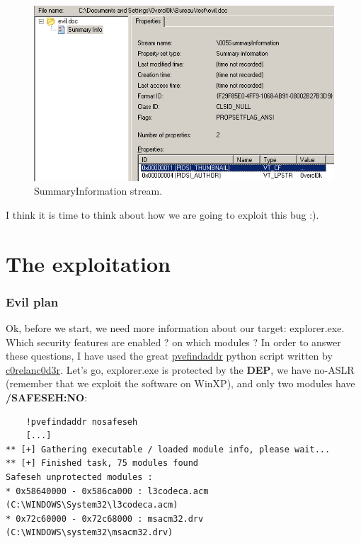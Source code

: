 \documentclass[12pt, titlepage]{article}
\begin{document}
\begin{figure}[H]
    \includegraphics{pics/summary.png}
    \caption{SummaryInformation stream.}
    \label{SummaryInformation stream.}
\end{figure}

I think it is time to think about how we are going to exploit this bug :).
\clearpage

\part{The exploitation}
\section{Evil plan}
Ok, before we start, we need more information about our target: explorer.exe. Which security features are enabled ? on which modules ?
In order to answer these questions, I have used the great \href{http://redmine.corelan.be:8800/projects/pvefindaddr}{pvefindaddr} python script written by \href{http://www.corelan.be/}{c0relanc0d3r}. Let's go, explorer.exe is protected by the \textbf{DEP}, we have no-ASLR (remember that we exploit the software on WinXP), and only two modules have \textbf{/SAFESEH:NO}:

\lstset{caption=Find nosafeseh modules with pvefindaddr}
\begin{lstlisting}
    !pvefindaddr nosafeseh
    [...]
** [+] Gathering executable / loaded module info, please wait...
** [+] Finished task, 75 modules found
Safeseh unprotected modules :
* 0x58640000 - 0x586ca000 : l3codeca.acm  (C:\WINDOWS\System32\l3codeca.acm)
* 0x72c60000 - 0x72c68000 : msacm32.drv  (C:\WINDOWS\system32\msacm32.drv)
\end{lstlisting}
\end{document}
